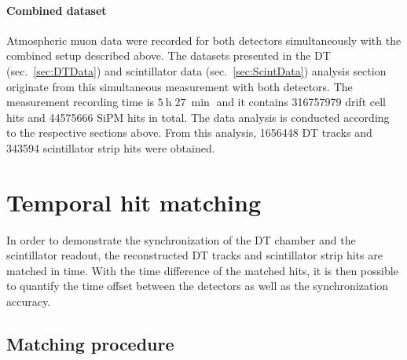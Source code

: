 \paragraph{Combined dataset}
Atmospheric muon data were recorded for both detectors simultaneously with the combined setup described above. The datasets presented in the \ac{DT} (sec.\ \ref{sec:DTData}) and scintillator data (sec.\ \ref{sec:ScintData}) analysis section originate from this simultaneous measurement with both detectors. The measurement recording time is $\SI{5}{\hour}\;\SI{27}{\min}$ and it contains \num{316757979} drift cell hits and \num{44575666} \ac{SiPM} hits in total. The data analysis is conducted according to the respective sections above. From this analysis, \num{1656448} \ac{DT} tracks and \num{343594} scintillator strip hits were obtained.


\FloatBarrier
\section{Temporal hit matching}
\label{sec:Combined-TemporalMatching}
In order to demonstrate the synchronization of the \ac{DT} chamber and the scintillator readout, the reconstructed \ac{DT} tracks and scintillator strip hits are matched in time. With the time difference of the matched hits, it is then possible to quantify the time offset between the detectors as well as the synchronization accuracy.

\subsection{Matching procedure}
\label{sec:Combined-TemporalMatching-Procedure}
